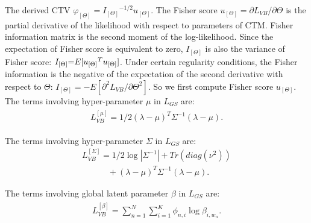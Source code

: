 \documentclass[journal]{IEEEtran}
\begin{document}
The derived CTV ${\varphi _{[\Theta]}} = {I_{[\Theta ]}}^{ - 1/2}{u_{[\Theta]}}$. The Fisher score ${u_{[\Theta ]}} = {{\partial L_{VB}}}/{{\partial \Theta }}$ is the partial derivative of the likelihood with respect to parameters of CTM. Fisher information matrix is the second moment of the log-likelihood. Since the expectation of Fisher score is equivalent to zero, $I_{[\Theta ]}$ is also the variance of Fisher score: ${I_{[\Theta ]}}{\rm{ = }}E[{u_{[\Theta ]}}^T{u_{[\Theta ]}}]$. Under certain regularity conditions, the Fisher information is the negative of the expectation of the second derivative with respect to $\Theta$: ${I_{[\Theta ]}} =  - E[ {{\partial ^2}L_{VB}}/{\partial {\Theta ^2}}]$. So we first compute Fisher score ${u_{[\Theta ]}}$. The terms involving hyper-parameter $\mu$ in ${L_{GS}}$ are:
\begin{equation} \label{Equa:appendix-mu}
    \begin{array}{l}
    \begin{aligned}
        {L_{VB}^{[\mu ]} = 1/2{(\lambda  - \mu )^T}{\Sigma ^{ - 1}}(\lambda  - \mu )}.
    \end{aligned}
    \end{array}
\end{equation}

The terms involving hyper-parameter $\Sigma$ in ${L_{GS}}$ are:
\begin{equation} \label{Equa:appendix-sigma}
    \begin{array}{l}
    L_{VB}^{[\Sigma ]} = 1/2\log |{\Sigma ^{ - 1}}| + Tr(diag({\nu ^2}))\\
    \;\;\;\;\;\;\;\;\;\;\; + {(\lambda  - \mu )^T}{\Sigma ^{ - 1}}(\lambda  - \mu ).
    \end{array}
    \end{equation}

The terms involving global latent parameter $\beta$ in ${L_{GS}}$ are:
\begin{equation} \label{Equa:appendix-beta}
    \begin{array}{l}
    \begin{aligned}
        {L_{VB}^{[\beta ]} = \sum\limits_{n = 1}^N {\sum\limits_{i = 1}^K {{\phi _{n,i}}\log {\beta _{i,{w_n}}}} }} .
    \end{aligned}
    \end{array}
\end{equation}
\end{document}
